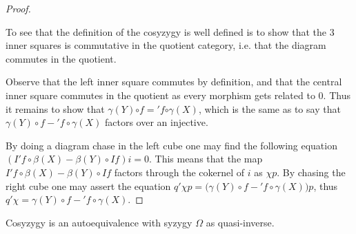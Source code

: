 \begin{proof}
\begin{center}
        \end{center}
        To see that the definition of the cosyzygy is well defined is to show that the 3 inner squares is commutative in the quotient category, i.e. that the diagram commutes in the quotient.
        
        Observe that the left inner square commutes by definition, and that the central inner square commutes in the quotient as every morphism gets related to $0$. Thus it remains to show that \underline{$\gamma (Y)$}$\circ$\underline{$f$}$=$\underline{$'f$}$\circ$\underline{$\gamma (X)$}, which is the same as to say that $\gamma (Y)\circ$$f-$$'f\circ\gamma (X)$ factors over an injective.

        By doing a diagram chase in the left cube one may find the following equation $(I'f\circ \beta(X)-\beta (Y)\circ If)i=0$. This means that the map $I'f\circ \beta(X)-\beta (Y)\circ If$ factors through the cokernel of $i$ as $\chi p$. By chasing the right cube one may assert the equation $q'\chi p = (\gamma (Y)\circ$$f-$$'f\circ\gamma (X))p$, thus $q'\chi =$$\gamma (Y)\circ$$f-$$'f\circ\gamma (X)$.
    \end{proof}

    \begin{corollary}
        Cosyzygy \upside{$\Omega$} is an autoequivalence with syzygy $\Omega$ as quasi-inverse.
    \end{corollary}

